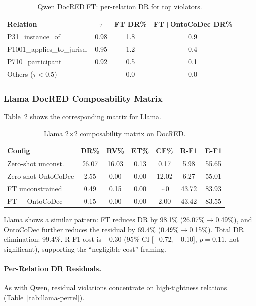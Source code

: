 \documentclass[11pt,a4paper]{article}
\newcommand{\sys}{OntoCoDec}
\newcommand{\pp}{\text{pp}}
\begin{document}
\begin{table}[t]
\centering
\small
\caption{Qwen DocRED FT: per-relation DR for top violators.}
\label{tab:qwen-perrel}
\begin{tabular}{lccc}
\toprule
\textbf{Relation} & $\tau$ & \textbf{FT DR\%} & \textbf{FT+\sys{} DR\%} \\
\midrule
P31\_instance\_of & 0.98 & 1.8 & 0.9 \\
P1001\_applies\_to\_jurisd. & 0.95 & 1.2 & 0.4 \\
P710\_participant & 0.92 & 0.5 & 0.1 \\
Others ($\tau<0.5$) & --- & 0.0 & 0.0 \\
\bottomrule
\end{tabular}
\end{table}

\subsubsection{Llama DocRED Composability Matrix}

Table~\ref{tab:llama-composability} shows the corresponding matrix for Llama.

\begin{table}[t]
\centering
\small
\caption{Llama 2$\times$2 composability matrix on DocRED.}
\label{tab:llama-composability}
\begin{tabular}{lcccccc}
\toprule
\textbf{Config} & \textbf{DR\%} & \textbf{RV\%} & \textbf{ET\%} & \textbf{CF\%} & \textbf{R-F1} & \textbf{E-F1} \\
\midrule
Zero-shot unconst. & 26.07 & 16.03 & 0.13 & 0.17 & 5.98 & 55.65 \\
Zero-shot \sys{} & 2.55 & 0.00 & 0.00 & 12.02 & 6.27 & 55.01 \\
FT unconstrained & 0.49 & 0.15 & 0.00 & ${\sim}$0 & 43.72 & 83.93 \\
FT + \sys{} & 0.15 & 0.00 & 0.00 & 2.00 & 43.42 & 83.55 \\
\bottomrule
\end{tabular}
\end{table}

Llama shows a similar pattern: FT reduces DR by 98.1\% (26.07\%$\rightarrow$0.49\%), and \sys{} further reduces the residual by 69.4\% (0.49\%$\rightarrow$0.15\%).
Total DR elimination: 99.4\%.
R-F1 cost is $-$0.30\pp{} (95\% CI [$-$0.72, $+$0.10], $p=0.11$, not significant), supporting the ``negligible cost'' framing.

\paragraph{Per-Relation DR Residuals.}
As with Qwen, residual violations concentrate on high-tightness relations (Table~\ref{tab:llama-perrel}).
\end{document}
